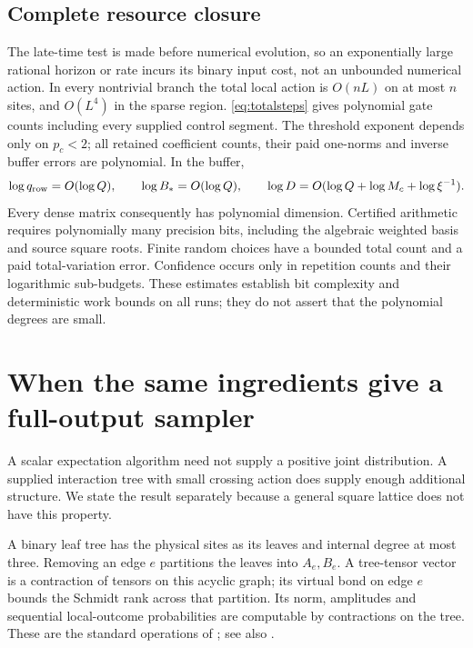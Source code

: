 \documentclass[11pt,reqno]{amsart}
\numberwithin{equation}{section}
\theoremstyle{definition}
\theoremstyle{remark}
\begin{document}
\subsection{Complete resource closure}
The late-time test is made before numerical evolution, so an exponentially large rational horizon or rate incurs its binary input cost, not an unbounded numerical action. In every nontrivial branch the total local action is $O(nL)$ on at most $n$ sites, and $O(L^4)$ in the sparse region. \eqref{eq:totalsteps} gives polynomial gate counts including every supplied control segment. The threshold exponent depends only on $p_c<2$; all retained coefficient counts, their paid one-norms and inverse buffer errors are polynomial. In the buffer,
\[
 \log q_{\rm row}=O(\log Q),\qquad
 \log B_*=O(\log Q),\qquad
 \log D=O(\log Q+\log M_c+\log\xi^{-1}).
\]
Every dense matrix consequently has polynomial dimension. Certified arithmetic requires polynomially many precision bits, including the algebraic weighted basis and source square roots. Finite random choices have a bounded total count and a paid total-variation error. Confidence occurs only in repetition counts and their logarithmic sub-budgets. These estimates establish bit complexity and deterministic work bounds on all runs; they do not assert that the polynomial degrees are small.


\section{When the same ingredients give a full-output sampler}\label{sec:sampling}

A scalar expectation algorithm need not supply a positive joint distribution. A supplied interaction tree with small crossing action does supply enough additional structure. We state the result separately because a general square lattice does not have this property.

A binary leaf tree has the physical sites as its leaves and internal degree at most three. Removing an edge $e$ partitions the leaves into $A_e,B_e$. A tree-tensor vector is a contraction of tensors on this acyclic graph; its virtual bond on edge $e$ bounds the Schmidt rank across that partition. Its norm, amplitudes and sequential local-outcome probabilities are computable by contractions on the tree. These are the standard operations of \cite[Theorems~1--4]{SDV}; see also \cite[Sections~2.2 and~3.2]{Seitz}.
\end{document}
